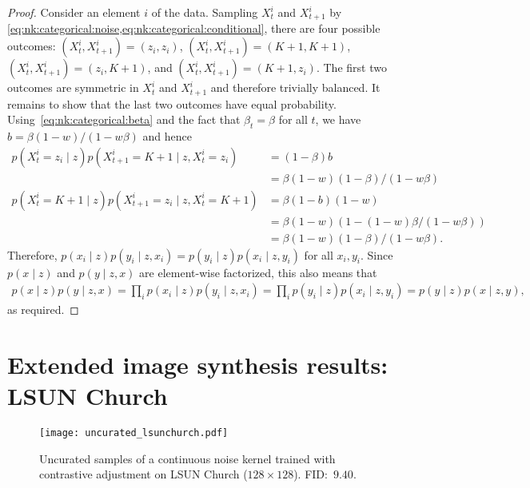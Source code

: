 \documentclass[10pt,twocolumn,letterpaper]{article}
\begin{document}
\begin{proof}
  Consider an element $i$ of the data.
  Sampling $X_{t}^{i}$ and $X_{t+1}^{i}$ by \cref{eq:nk:categorical:noise,eq:nk:categorical:conditional}, there are four possible outcomes: $(X_{t}^{i}, X_{t+1}^{i}) = (z_{i}, z_{i})$, $(X_{t}^{i}, X_{t+1}^{i}) = (K + 1, K + 1)$, $(X_{t}^{i}, X_{t+1}^{i}) = (z_{i}, K + 1)$, and $(X_{t}^{i}, X_{t+1}^{i}) = (K + 1, z_{i})$.
  The first two outcomes are symmetric in $X_{t}^{i}$ and $X_{t+1}^{i}$ and therefore trivially balanced.
  It remains to show that the last two outcomes have equal probability.
  Using~\eqref{eq:nk:categorical:beta} and the fact that $\beta_{t} = \beta$ for all $t$, we have $b = \beta (1 - w) / (1 - w \beta)$ and hence
  \begin{align}
    p(X_{t}^{i} = z_{i} \mid z) p(X_{t+1}^{i} = K + 1 \mid z, X_{t}^{i} = z_{i})
    & = (1 - \beta) b
      \\
    & = \beta (1 - w) (1 - \beta) / (1 - w \beta)
      \\
    p(X_{t}^{i} = K + 1 \mid z) p(X_{t+1}^{i} = z_{i} \mid z, X_{t}^{i} = K + 1)
    & = \beta (1 - b) (1 - w)
      \\
    & = \beta (1 - w) (1 - (1 - w)\beta  / (1 - w \beta))
      \\
    & = \beta (1 - w) (1 - \beta) / (1 - w \beta)
      .
  \end{align}
  Therefore, $p(x_{i} \mid z)p(y_{i} \mid z, x_{i}) = p(y_{i} \mid z)p(x_{i} \mid z, y_{i})$ for all $x_{i},y_{i}$.
  Since $p(x \mid z)$ and $p(y \mid z, x)$ are element-wise factorized, this also means that
  \begin{align}
    p(x \mid z)p(y \mid z, x)
    =
    \prod_{i} p(x_{i} \mid z)p(y_{i} \mid z, x_{i})
    =
    \prod_{i} p(y_{i} \mid z)p(x_{i} \mid z, y_{i})
    =
    p(y \mid z)p(x \mid z, y)
    ,
  \end{align}
  as required.
\end{proof}


\newpage
\section{Extended image synthesis results: LSUN Church}\label{app:imagesynthesis:lsunchurch}
\begin{figure}[h!]
  \centering
  \texttt{[image: uncurated\_lsunchurch.pdf]}\caption{
    Uncurated samples of a continuous noise kernel trained with contrastive adjustment on LSUN Church ($128 \times 128$).
    FID:~$9.40$.
  }\end{figure}
\end{document}
